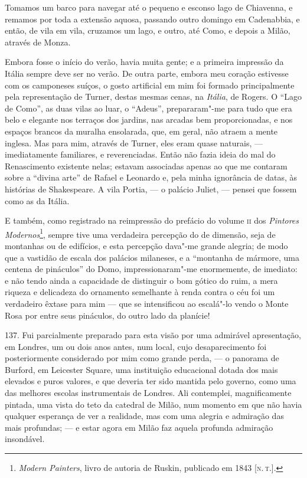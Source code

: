 Tomamos um barco para navegar até o pequeno e esconso lago de Chiavenna,
e remamos por toda a extensão aquosa, passando outro domingo em
Cadenabbia, e então, de vila em vila, cruzamos um lago, e outro, até
Como, e depois a Milão, através de Monza.

Embora fosse o início do verão, havia muita gente; e a primeira
impressão da Itália sempre deve ser no verão. De outra parte, embora meu
coração estivesse com os camponeses suíços, o gosto artificial em mim
foi formado principalmente pela representação de Turner, destas mesmas
cenas, na \emph{Itália}, de Rogers. O ``Lago de Como'', as duas vilas ao
luar, o ``Adeus'', prepararam"-me para tudo que era belo e elegante nos
terraços dos jardins, nas arcadas bem proporcionadas, e nos espaços
brancos da muralha ensolarada, que, em geral, não atraem a mente
inglesa. Mas para mim, através de Turner, eles eram quase naturais, ---
imediatamente familiares, e reverenciadas. Então não fazia ideia do mal
do Renascimento existente nelas; estavam associadas apenas ao que me
contaram sobre a ``divina arte'' de Rafael e Leonardo e, pela minha
ignorância de datas, às histórias de Shakespeare. A vila Portia, --- o
palácio Juliet, --- pensei que fossem como as da Itália.

E também, como registrado na reimpressão do prefácio do volume \textsc{ii} dos
\emph{Pintores Modernos}\footnote{\emph{Modern Painters}, livro de
  autoria de Ruskin, publicado em 1843 {[}\textsc{n.\,t.}{]}.}, sempre tive uma
verdadeira percepção do de dimensão, seja de montanhas ou de edifícios,
e esta percepção dava"-me grande alegria; de modo que a vastidão de
escala dos palácios milaneses, e a ``montanha de mármore, uma centena de
pináculos'' do Domo, impressionaram"-me enormemente, de imediato: e não
tendo ainda a capacidade de distinguir o bom gótico do ruim, a mera
riqueza e delicadeza do ornamento semelhante à renda contra o céu foi um
verdadeiro êxtase para mim --- que se intensificou ao escalá"-lo vendo o
Monte Rosa por entre seus pináculos, do outro lado da planície!

137. Fui parcialmente preparado para esta visão por uma admirável
apresentação, em Londres, um ou dois anos antes, num local, cujo
desaparecimento foi posteriormente considerado por mim como grande
perda, --- o panorama de Burford, em Leicester Square, uma instituição
educacional dotada dos mais elevados e puros valores, e que deveria ter
sido mantida pelo governo, como uma das melhores escolas instrumentais
de Londres. Ali contemplei, magnificamente pintada, uma vista do teto da
catedral de Milão, num momento em que não havia qualquer esperança de
ver a realidade, mas com uma alegria e admiração das mais profundas; ---
e estar agora em Milão faz aquela profunda admiração insondável.

